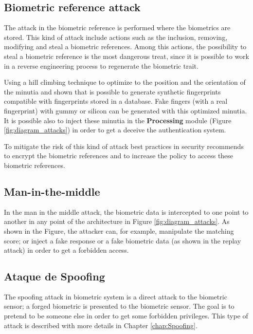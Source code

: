 \subsection{Biometric reference attack}

The attack in the biometric reference is performed where the biometrics are stored. This kind of attack include actions such as the inclusion, removing, modifying and steal a biometric references. Among this actions, the possibility to steal a biometric reference is the most dangerous treat, since it is possible to work in a reverse engineering process to regenerate the biometric trait. 

Using a hill climbing technique to optimize to the position and the orientation of the minutia \cite{MartinezDiaz2006} and \cite{hill2001risk} shown that is possible to generate synthetic fingerprints compatible with fingerprints stored in a database. Fake fingers (with a real fingerprint) with gummy or silicon can be generated with this optimized minutia. It is possible also to inject these minutia in the \textbf{Processing} module (Figure \ref{fig:diagram_attacks}) in order to get a deceive the authentication system. 

To mitigate the risk of this kind of attack best practices in security recommends to encrypt the biometric references and to increase the policy to access these biometric references. 

\subsection{Man-in-the-middle}

In the man in the middle attack, the biometric data is intercepted to one point to another in any point of the architecture in Figure \ref{fig:diagram_attacks}.  As shown in the Figure, the attacker can, for example, manipulate the matching score; or inject a fake response or a fake biometric data (as shown in the replay attack) in order to get a forbidden access. 

\subsection{Ataque de Spoofing}

The spoofing attack in biometric system is a direct attack to the biometric sensor; a forged biometric is presented to the biometric sensor. The goal is to pretend to be someone else in order to get some forbidden privileges. This type of attack is described with more details in Chapter \ref{chap:Spoofing}.

